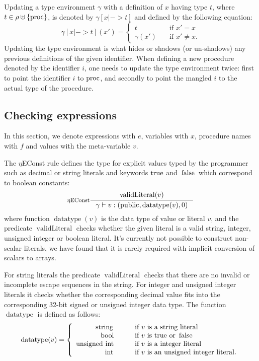 \documentclass[a4paper, 10pt, draft]{report}
\newcommand{\mycode}[1]{\ensuremath{\mbox{\lstinline{#1}}}}
\begin{document}
Updating a type environment $\gamma$ with a definition of $x$ having type $t$,
where $t \in \rho \uplus \left\{\mycode{proc}\right\}$, is denoted by
$\gamma\!\left[ x |-> t \right]$ and defined by the following equation:
\[ \gamma\!\left[ x |-> t \right]\left(x'\right) = \left\{\begin{array}{ll}
    t                  & \quad \text{if $x' = x$}\\
    \gamma\!\left(x'\right) & \quad \text{if $x' \not = x$}.
  \end{array}\right.
\]
Updating the type environment is what hides or shadows (or un-shadows) any
previous definitions of the given identifier. When defining a new procedure
denoted by the identifier $i$, one needs to update the type environment twice:
first to point the identifier $i$ to \mycode{proc}, and secondly to point the
mangled $i$ to the actual type of the procedure.

\subsection{Checking expressions}\label{sec:checking:typing:expressions}

In this section, we denote expressions with $e$, variables with $x$, procedure
names with $f$ and values with the meta-variable $v$.

The $\eta$EConst rule defines the type for explicit values typed by the
programmer such as decimal or string literals and keywords \mycode{true} and
\mycode{false} which correspond to boolean constants:
\[ \inference[$\eta$EConst]{
  \operatorname{validLiteral}(v)
}{
  \gamma |- v : (\mycode{public}, \operatorname{datatype}(v), 0)
} \]
where function $\operatorname{datatype}\!\left(v\right)$ is the data type of
value or literal $v$, and the predicate $\operatorname{validLiteral}$ checks
whether the given literal is a valid string, integer, unsigned integer or
boolean literal. It's currently not possible to construct non-scalar literals,
we have found that it is rarely required with implicit conversion of scalars to
arrays.

For string literals the predicate $\operatorname{validLiteral}$
checks that there are no invalid or incomplete escape sequences in the string.
For integer and unsigned integer literals it checks whether the corresponding
decimal value fits into the corresponding 32-bit signed or unsigned integer
data type. The function
$\operatorname{datatype}$ is defined as follows:
\[
 \operatorname{datatype}\!\left(v\right) = \left\{\begin{array}{rll}
                                            \mycode{string} & \qquad\mbox{if $v$ is a string literal} \\
                                            \mycode{bool} & \qquad\mbox{if $v$ is \mycode{true} or \mycode{false}} \\
                                            \mycode{unsigned int} & \qquad\mbox{if $v$ is a integer literal} \\
                                            \mycode{int} & \qquad\mbox{if $v$ is an unsigned integer literal.}
                                           \end{array}\right.
\]
\end{document}
